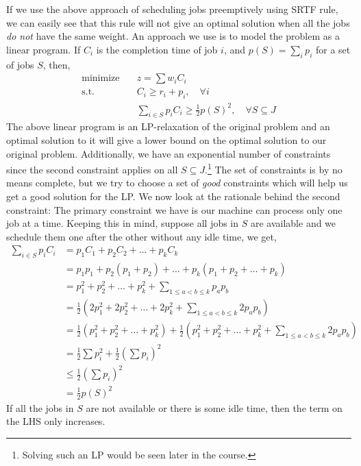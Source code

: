 \documentclass[10pt]{article}
\numberwithin{equation}{section}
\begin{document}
If we use the above approach of scheduling jobs preemptively using SRTF rule, we can easily see that this rule will not give an optimal solution when all the jobs \emph{do not} have the same weight. An approach we use is to model the problem as a linear program. If $C_i$ is the completion time of job $i$, and $p(S) = \sum_i p_i$ for a set of jobs $S$, then,
\begin{align}\label{eq:weighted-job-scheduling-lp}
\text{minimize} \quad    & z = \sum w_iC_i    \\
\text{s.t.}     \quad    & C_i \geq r_i + p_i, \quad \forall i \nonumber \\
                         & \sum_{i \in S}p_iC_i \geq \frac{1}{2} p(S)^2, \quad \forall S \subseteq J \nonumber
\end{align}
The above linear program is an LP-relaxation of the original problem and an optimal solution to it will give a lower bound on the optimal solution to our original problem. Additionally, we have an exponential number of constraints since the second constraint applies on all $S \subseteq J$.\footnote{Solving such an LP would be seen later in the course.} The set of constraints is by no means complete, but we try to choose a set of \emph{good} constraints which will help us get a good solution for the LP. We now look at the rationale behind the second constraint: The primary constraint we have is our machine can process only one job at a time. Keeping this in mind, suppose all jobs in $S$ are available and we schedule them one after the other without any idle time, we get,
\begin{align*}
\sum_{i \in S}p_iC_i   & = p_1C_1 + p_2C_2 + \ldots + p_kC_k \\
                     & = p_1p_1 + p_2(p_1 + p_2) + \ldots + p_k(p_1 + p_2 + \ldots + p_k) \\
                     & = p_1^2 + p_2^2 + \ldots + p_k^2 + \sum_{1 \leq a < b \leq k}p_ap_b \\
                     & = \frac{1}{2}(2p_1^2 + 2p_2^2 + \ldots + 2p_k^2 + \sum_{1 \leq a < b \leq k}2p_ap_b) \\
                     & = \frac{1}{2}(p_1^2 + p_2^2 + \ldots + p_k^2) + \frac{1}{2}(p_1^2 + p_2^2 + \ldots + p_k^2 + \sum_{1 \leq a < b \leq k}2p_ap_b) \\
                     & = \frac{1}{2}\sum p_i^2 + \frac{1}{2}(\sum p_i)^2 \\  
                     & \leq \frac{1}{2}(\sum p_i)^2 \\
                     & = \frac{1}{2} p(S)^2
\end{align*}
If all the jobs in $S$ are not available or there is some idle time, then the term on the LHS only increases.
\end{document}
